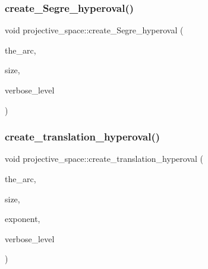 \subsubsection{\texorpdfstring{create\+\_\+\+Segre\+\_\+hyperoval()}{create\_Segre\_hyperoval()}}
{\footnotesize\ttfamily void projective\+\_\+space\+::create\+\_\+\+Segre\+\_\+hyperoval (\begin{DoxyParamCaption}\item[{\mbox{\hyperlink{galois_8h_a09fddde158a3a20bd2dcadb609de11dc}{I\+NT}} $\ast$}]{the\+\_\+arc,  }\item[{\mbox{\hyperlink{galois_8h_a09fddde158a3a20bd2dcadb609de11dc}{I\+NT}} \&}]{size,  }\item[{\mbox{\hyperlink{galois_8h_a09fddde158a3a20bd2dcadb609de11dc}{I\+NT}}}]{verbose\+\_\+level }\end{DoxyParamCaption})}

\mbox{\label{classprojective__space_a3eff9f0e686ce38a82b3bf0f2c1a1e6f}} 
\subsubsection{\texorpdfstring{create\+\_\+translation\+\_\+hyperoval()}{create\_translation\_hyperoval()}}
{\footnotesize\ttfamily void projective\+\_\+space\+::create\+\_\+translation\+\_\+hyperoval (\begin{DoxyParamCaption}\item[{\mbox{\hyperlink{galois_8h_a09fddde158a3a20bd2dcadb609de11dc}{I\+NT}} $\ast$}]{the\+\_\+arc,  }\item[{\mbox{\hyperlink{galois_8h_a09fddde158a3a20bd2dcadb609de11dc}{I\+NT}} \&}]{size,  }\item[{\mbox{\hyperlink{galois_8h_a09fddde158a3a20bd2dcadb609de11dc}{I\+NT}}}]{exponent,  }\item[{\mbox{\hyperlink{galois_8h_a09fddde158a3a20bd2dcadb609de11dc}{I\+NT}}}]{verbose\+\_\+level }\end{DoxyParamCaption})}

\mbox{\label{classprojective__space_ab2caba5024959bb9db75d3cb711c2f30}} 
